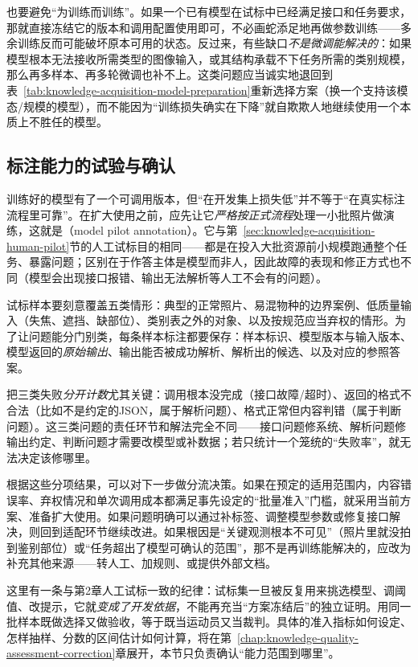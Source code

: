 也要避免“为训练而训练”。如果一个已有模型在试标中已经满足接口和任务要求，那就直接冻结它的版本和调用配置使用即可，不必画蛇添足地再做参数训练——多余训练反而可能破坏原本可用的状态。反过来，有些缺口\emph{不是微调能解决的}：如果模型根本无法接收所需类型的图像输入，或其结构承载不下任务所需的类别规模，那么再多样本、再多轮微调也补不上。这类问题应当诚实地退回到表~\ref{tab:knowledge-acquisition-model-preparation}重新选择方案（换一个支持该模态/规模的模型），而不能因为“训练损失确实在下降”就自欺欺人地继续使用一个本质上不胜任的模型。

\subsection{标注能力的试验与确认}
\label{sec:knowledge-acquisition-model-pilot-validation}

训练好的模型有了一个可调用版本，但“在开发集上损失低”并不等于“在真实标注流程里可靠”。在扩大使用之前，应先让它\emph{严格按正式流程}处理一小批照片做演练，这就是（model pilot annotation）。它与第~\ref{sec:knowledge-acquisition-human-pilot}节的人工试标目的相同——都是在投入大批资源前小规模跑通整个任务、暴露问题；区别在于作答主体是模型而非人，因此故障的表现和修正方式也不同（模型会出现接口报错、输出无法解析等人工不会有的问题）。

试标样本要刻意覆盖五类情形：典型的正常照片、易混物种的边界案例、低质量输入（失焦、遮挡、缺部位）、类别表之外的对象、以及按规范应当弃权的情形。为了让问题能分门别类，每条样本标注都要保存：样本标识、模型版本与输入版本、模型返回的\emph{原始输出}、输出能否被成功解析、解析出的候选、以及对应的参照答案。

把三类失败\emph{分开计数}尤其关键：调用根本没完成（接口故障/超时）、返回的格式不合法（比如不是约定的JSON，属于解析问题）、格式正常但内容判错（属于判断问题）。这三类问题的责任环节和解法完全不同——接口问题修系统、解析问题修输出约定、判断问题才需要改模型或补数据；若只统计一个笼统的“失败率”，就无法决定该修哪里。

根据这些分项结果，可以对下一步做分流决策。如果在预定的适用范围内，内容错误率、弃权情况和单次调用成本都满足事先设定的“批量准入”门槛，就采用当前方案、准备扩大使用。如果问题明确可以通过补标签、调整模型参数或修复接口解决，则回到适配环节继续改进。如果根因是“关键观测根本不可见”（照片里就没拍到鉴别部位）或“任务超出了模型可确认的范围”，那不是再训练能解决的，应改为补充其他来源——转人工、加规则、或提供外部文档。

这里有一条与第2章人工试标一致的纪律：试标集一旦被反复用来挑选模型、调阈值、改提示，它就\emph{变成了开发依据}，不能再充当“方案冻结后”的独立证明。用同一批样本既做选择又做验收，等于既当运动员又当裁判。具体的准入指标如何设定、怎样抽样、分数的区间估计如何计算，将在第~\ref{chap:knowledge-quality-assessment-correction}章展开，本节只负责确认“能力范围到哪里”。

